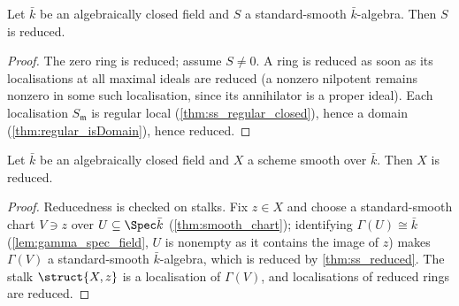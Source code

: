 \begin{theorem}
  \label{thm:ss_reduced}
  \leanok
  Let \(\bar k\) be an algebraically closed field and \(S\) a standard-smooth
  \(\bar k\)-algebra. Then \(S\) is reduced.
\end{theorem}
\begin{proof}
  \leanok
  The zero ring is reduced; assume \(S \neq 0\). A ring is reduced as soon as
  its localisations at all maximal ideals are reduced (a nonzero nilpotent
  remains nonzero in some such localisation, since its annihilator is a proper
  ideal). Each localisation \(S_{\mathfrak m}\) is regular local
  (\ref{thm:ss_regular_closed}), hence a domain
  (\ref{thm:regular_isDomain}), hence reduced.
\end{proof}

\begin{theorem}
  \label{thm:smooth_scheme_reduced}
  \leanok
  Let \(\bar k\) be an algebraically closed field and \(X\) a scheme smooth
  over \(\bar k\). Then \(X\) is reduced.
\end{theorem}
\begin{proof}
  \leanok
  Reducedness is checked on stalks. Fix \(z \in X\) and choose a
  standard-smooth chart \(V \ni z\) over \(U \subseteq \Spec \bar k\)
  (\ref{thm:smooth_chart}); identifying \(\Gamma(U) \cong \bar k\)
  (\ref{lem:gamma_spec_field}, \(U\) is nonempty as it contains the image of
  \(z\)) makes \(\Gamma(V)\) a standard-smooth \(\bar k\)-algebra, which is
  reduced by \ref{thm:ss_reduced}. The stalk \(\struct{X,z}\) is a localisation
  of \(\Gamma(V)\), and localisations of reduced rings are reduced.
\end{proof}

